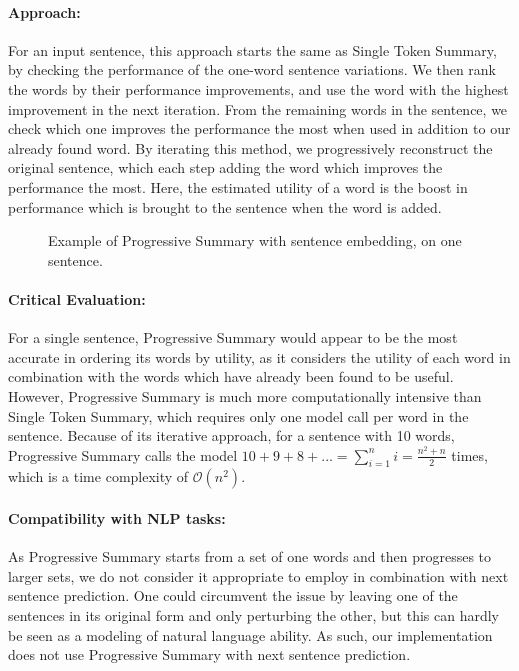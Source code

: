 \paragraph{Approach:}
For an input sentence, this approach starts the same as Single Token Summary, by checking the performance of the one-word sentence variations.
We then rank the words by their performance improvements, and use the word with the highest improvement in the next iteration.
From the remaining words in the sentence, we check which one improves the performance the most when used in addition to our already found word.
By iterating this method, we progressively reconstruct the original sentence, which each step adding the word which improves the performance the most.
Here, the estimated utility of a word is the boost in performance which is brought to the sentence when the word is added.

\begin{figure}[H]
	
	\caption{Example of Progressive Summary with sentence embedding, on one sentence.}
	\label{fig:progressive-summary}
\end{figure}

\paragraph{Critical Evaluation:}
For a single sentence, Progressive Summary would appear to be the most accurate in ordering its words by utility, as it considers the utility of each word in combination with the words which have already been found to be useful.
However, Progressive Summary is much more computationally intensive than Single Token Summary, which requires only one model call per word in the sentence.
Because of its iterative approach, for a sentence with 10 words, Progressive Summary calls the model $10+9+8+... = \sum_{i=1}^{n}i = \frac{n^2 + n}{2}$ times, which is a time complexity of $\mathcal{O}(n^2)$.

\paragraph{Compatibility with NLP tasks:}
As Progressive Summary starts from a set of one words and then progresses to larger sets, we do not consider it appropriate to employ in combination with next sentence prediction.
One could circumvent the issue by leaving one of the sentences in its original form and only perturbing the other, but this can hardly be seen as a modeling of natural language ability.
As such, our implementation does not use Progressive Summary with next sentence prediction.

